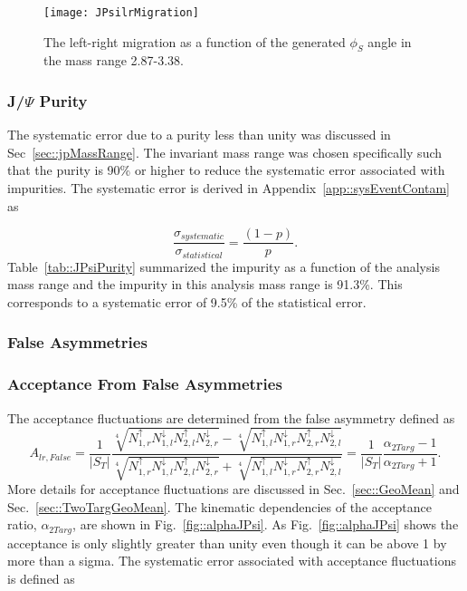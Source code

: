 \begin{figure}[h!t]
  \centering \texttt{[image: JPsilrMigration]}
  \caption{The left-right migration as a function of the generated $\phi_S$
    angle in the mass range 2.87-3.38.}
  \label{fig::JPsilrMigration}
\end{figure}

\subsubsection{J/$\Psi$ Purity}

The systematic error due to a {\jp} purity less than unity was discussed in
Sec~\ref{sec::jpMassRange}.  The invariant mass range was chosen specifically
such that the {\jp} purity is 90\% or higher to reduce the systematic error
associated with impurities.  The systematic error is derived in
Appendix~\ref{app::sysEventContam} as

\begin{equation}
  \frac{\sigma_{systematic}}{\sigma_{statistical}} = \frac{(1-p)}{p}.
\end{equation}
\noindent
Table~\ref{tab::JPsiPurity} summarized the impurity as a function of the
analysis mass range and the impurity in this analysis mass range is 91.3\%.
This corresponds to a systematic error of 9.5\% of the statistical error.

\subsubsection{False Asymmetries}
\subsubsection{Acceptance From False Asymmetries}
The acceptance fluctuations are determined from the false asymmetry defined as
\begin{equation}
  A_{lr,False} = 
    \frac{1}{|S_T|}
    \frac{
      \sqrt[4]{
        N_{1,r}^\uparrow N_{1, l}^\downarrow
        N_{2,l}^\uparrow N_{2, r}^\downarrow
      } 
      -\sqrt[4]{
        N_{1,l}^\uparrow N_{1, r}^\downarrow
        N_{2,r}^\uparrow N_{2, l}^\downarrow
      }
    }{
      \sqrt[4]{
        N_{1,r}^\uparrow N_{1, l}^\downarrow
        N_{2,l}^\uparrow N_{2, r}^\downarrow
      } +
      \sqrt[4]{
        N_{1,l}^\uparrow N_{1, r}^\downarrow
        N_{2,r}^\uparrow N_{2, l}^\downarrow
      }
    } 
    = \frac{1}{|S_T|}
    \frac{
      \alpha_{2Targ} - 1     
    }{
      \alpha_{2Targ} + 1
    }.
    \label{equ::falseAccJPsi}
\end{equation}
\noindent
More details for acceptance fluctuations are discussed in
Sec.~\ref{sec::GeoMean} and Sec.~\ref{sec::TwoTargGeoMean}.  The kinematic
dependencies of the acceptance ratio, $\alpha_{2Targ}$, are shown in
Fig.~\ref{fig::alphaJPsi}.  As Fig.~\ref{fig::alphaJPsi} shows the acceptance is
only slightly greater than unity even though it can be above 1 by more than a
sigma.  The systematic error associated with acceptance fluctuations is defined
as

